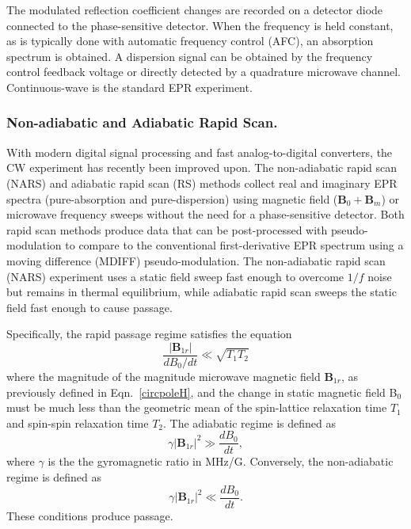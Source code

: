 The modulated reflection coefficient changes are recorded on a detector diode connected to the phase-sensitive detector. When the frequency is held constant, as is typically done with automatic frequency control (AFC), an absorption spectrum is obtained. \cite{poole1967electron} A dispersion signal can be obtained by the frequency control feedback voltage or directly detected by a quadrature microwave channel. Continuous-wave is the standard EPR experiment. 

\subsubsection*{Non-adiabatic and Adiabatic Rapid Scan.}
With modern digital signal processing and fast analog-to-digital converters, the CW experiment has recently been improved upon. The non-adiabatic rapid scan (NARS) \cite{KITTELL2011228, KITTELL201251, KITTELL201568, Hyde2013MDIFF, YU201558} and adiabatic rapid scan (RS) \cite{JOSHI200544,TSEITLIN200948, MITCHELL2012221, RScompare,MOSER2017} methods collect real and imaginary EPR spectra (pure-absorption and pure-dispersion) using magnetic field ($\mathbf{B}_0 + \mathbf{B}_m $) or microwave frequency sweeps without the need for a phase-sensitive detector. Both rapid scan methods produce data that can be post-processed with pseudo-modulation to compare to the conventional first-derivative EPR spectrum using a moving difference (MDIFF) pseudo-modulation. \cite{Hyde2013MDIFF} The non-adiabatic rapid scan (NARS) experiment uses a static field sweep fast enough to overcome $1/f$ noise but remains in thermal equilibrium, while adiabatic rapid scan sweeps the static field fast enough to cause passage. \cite{Weger1960} 

Specifically, the rapid passage regime satisfies the equation
\begin{equation}
    \frac{|\mathbf{B}_{1r}|}{d B_0/dt} \ll \sqrt{T_1 T_2}
\end{equation}
where the magnitude of the magnitude microwave magnetic field $\mathbf{B}_{1r}$, as previously defined in Eqn.~\ref{circpoleH}, and the change in static magnetic field B$_0$ must be much less than the geometric mean of the spin-lattice relaxation time $T_1$ and spin-spin relaxation time $T_2$. The adiabatic regime is defined as 
\begin{equation}
    \gamma |\mathbf{B}_{1r}|^2 \gg \frac{d B_0}{dt},
\end{equation}
where $\gamma$ is the the gyromagnetic ratio in MHz/G. Conversely, the non-adiabatic regime is defined as
\begin{equation}
    \gamma |\mathbf{B}_{1r}|^2 \ll \frac{d B_0}{dt}.
\end{equation}
These conditions produce passage. \cite{Weger1960}

